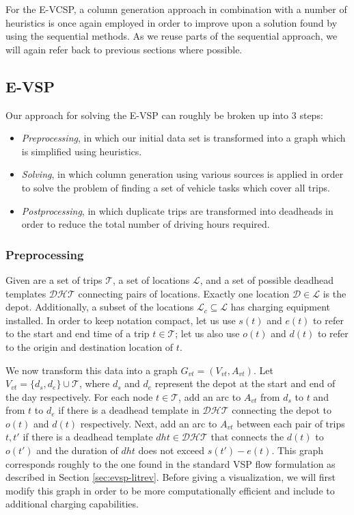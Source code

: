 \documentclass[]{article}
\begin{document}
For the E-VCSP, a column generation approach in combination with a number of heuristics is once again employed in order to improve upon a solution found by using the sequential methods. As we reuse parts of the sequential approach, we will again refer back to previous sections where possible.

\subsection{E-VSP} \label{sec:evsp-methodology}
Our approach for solving the E-VSP can roughly be broken up into 3 steps: 
\begin{itemize}
  \item \textit{Preprocessing}, in which our initial data set is transformed into a graph which is simplified using heuristics.
  \item \textit{Solving}, in which column generation using various sources is applied in order to solve the problem of finding a set of vehicle tasks which cover all trips. 
  \item \textit{Postprocessing}, in which duplicate trips are transformed into deadheads in order to reduce the total number of driving hours required. 
\end{itemize} 
\subsubsection{Preprocessing}
Given are a set of trips $\mathcal{T}$, a set of locations $\mathcal{L}$, and a set of possible deadhead templates $\mathcal{DHT}$ connecting pairs of locations. Exactly one location $\mathcal{D} \in \mathcal{L}$ is the depot. Additionally, a subset of the locations $\mathcal{L}_c \subseteq \mathcal{L}$ has charging equipment installed. In order to keep notation compact, let us use $s(t)$ and $e(t)$ to refer to the start and end time of a trip $t \in \mathcal{T}$; let us also use $o(t)$ and $d(t)$ to refer to the origin and destination location of $t$.

We now transform this data into a graph $G_{vt} = (V_{vt}, A_{vt})$. Let $V_{vt} = \{ d_{s}, d_{e} \} \cup \mathcal{T}$, where $d_{s}$ and $d_{e}$ represent the depot at the start and end of the day respectively. For each node $t \in \mathcal{T}$, add an arc to $A_{vt}$ from $d_{s}$ to $t$ and from $t$ to $d_{e}$ if there is a deadhead template in $\mathcal{DHT}$ connecting the depot to $o(t)$ and $d(t)$ respectively. Next, add an arc to $A_{vt}$ between each pair of trips $t, t'$ if there is a deadhead template $dht \in \mathcal{DHT}$ that connects the $d(t)$ to $o(t')$ and the duration of $dht$ does not exceed $s(t') - e(t)$. This graph corresponds roughly to the one found in the standard VSP flow formulation as described in Section \ref{sec:evsp-litrev}. Before giving a visualization, we will first modify this graph in order to be more computationally efficient and include to additional charging capabilities.
\end{document}
